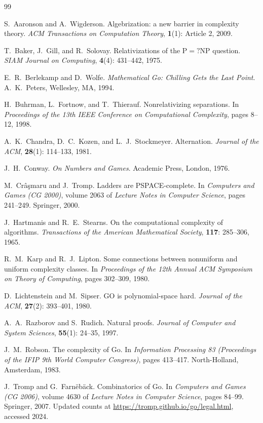 \documentclass[11pt,a4paper]{amsart}
\theoremstyle{plain}
\theoremstyle{definition}
\theoremstyle{remark}
\begin{document}
\begin{thebibliography}{99}

S.~Aaronson and A.~Wigderson.
\newblock Algebrization: a new barrier in complexity theory.
\newblock \emph{ACM Transactions on Computation Theory}, \textbf{1}(1):
  Article 2, 2009.

T.~Baker, J.~Gill, and R.~Solovay.
\newblock Relativizations of the $\mathrm{P} = ? \mathrm{NP}$ question.
\newblock \emph{SIAM Journal on Computing}, \textbf{4}(4): 431--442, 1975.

E.~R.~Berlekamp and D.~Wolfe.
\newblock \emph{Mathematical Go: Chilling Gets the Last Point}.
\newblock A.~K.~Peters, Wellesley, MA, 1994.

H.~Buhrman, L.~Fortnow, and T.~Thierauf.
\newblock Nonrelativizing separations.
\newblock In \emph{Proceedings of the 13th IEEE Conference on
  Computational Complexity}, pages 8--12, 1998.

A.~K.~Chandra, D.~C.~Kozen, and L.~J.~Stockmeyer.
\newblock Alternation.
\newblock \emph{Journal of the ACM}, \textbf{28}(1): 114--133, 1981.

J.~H.~Conway.
\newblock \emph{On Numbers and Games}.
\newblock Academic Press, London, 1976.

M.~Cr{\^a}{\c{s}}maru and J.~Tromp.
\newblock Ladders are PSPACE-complete.
\newblock In \emph{Computers and Games (CG 2000)}, volume 2063 of
  \emph{Lecture Notes in Computer Science}, pages 241--249.
  Springer, 2000.

J.~Hartmanis and R.~E.~Stearns.
\newblock On the computational complexity of algorithms.
\newblock \emph{Transactions of the American Mathematical Society},
  \textbf{117}: 285--306, 1965.

R.~M.~Karp and R.~J.~Lipton.
\newblock Some connections between nonuniform and uniform complexity
  classes.
\newblock In \emph{Proceedings of the 12th Annual ACM Symposium on
  Theory of Computing}, pages 302--309, 1980.

D.~Lichtenstein and M.~Sipser.
\newblock GO is polynomial-space hard.
\newblock \emph{Journal of the ACM}, \textbf{27}(2): 393--401, 1980.

A.~A.~Razborov and S.~Rudich.
\newblock Natural proofs.
\newblock \emph{Journal of Computer and System Sciences},
  \textbf{55}(1): 24--35, 1997.

J.~M.~Robson.
\newblock The complexity of Go.
\newblock In \emph{Information Processing 83 (Proceedings of the IFIP
  9th World Computer Congress)}, pages 413--417.
  North-Holland, Amsterdam, 1983.

J.~Tromp and G.~Farn{\"e}b{\"a}ck.
\newblock Combinatorics of Go.
\newblock In \emph{Computers and Games (CG 2006)}, volume 4630 of
  \emph{Lecture Notes in Computer Science}, pages 84--99.
  Springer, 2007. Updated counts at
  \url{https://tromp.github.io/go/legal.html}, accessed 2024.

\end{thebibliography}
\end{document}

